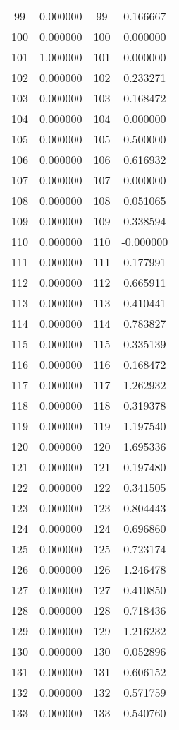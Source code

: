 \documentclass[12pt]{article}
\begin{document}
\begin{longtable}{@{}cccc@{}}
99 & 0.000000 & 99 & 0.166667 \\
100 & 0.000000 & 100 & 0.000000 \\
101 & 1.000000 & 101 & 0.000000 \\
102 & 0.000000 & 102 & 0.233271 \\
103 & 0.000000 & 103 & 0.168472 \\
104 & 0.000000 & 104 & 0.000000 \\
105 & 0.000000 & 105 & 0.500000 \\
106 & 0.000000 & 106 & 0.616932 \\
107 & 0.000000 & 107 & 0.000000 \\
108 & 0.000000 & 108 & 0.051065 \\
109 & 0.000000 & 109 & 0.338594 \\
110 & 0.000000 & 110 & -0.000000 \\
111 & 0.000000 & 111 & 0.177991 \\
112 & 0.000000 & 112 & 0.665911 \\
113 & 0.000000 & 113 & 0.410441 \\
114 & 0.000000 & 114 & 0.783827 \\
115 & 0.000000 & 115 & 0.335139 \\
116 & 0.000000 & 116 & 0.168472 \\
117 & 0.000000 & 117 & 1.262932 \\
118 & 0.000000 & 118 & 0.319378 \\
119 & 0.000000 & 119 & 1.197540 \\
120 & 0.000000 & 120 & 1.695336 \\
121 & 0.000000 & 121 & 0.197480 \\
122 & 0.000000 & 122 & 0.341505 \\
123 & 0.000000 & 123 & 0.804443 \\
124 & 0.000000 & 124 & 0.696860 \\
125 & 0.000000 & 125 & 0.723174 \\
126 & 0.000000 & 126 & 1.246478 \\
127 & 0.000000 & 127 & 0.410850 \\
128 & 0.000000 & 128 & 0.718436 \\
129 & 0.000000 & 129 & 1.216232 \\
130 & 0.000000 & 130 & 0.052896 \\
131 & 0.000000 & 131 & 0.606152 \\
132 & 0.000000 & 132 & 0.571759 \\
133 & 0.000000 & 133 & 0.540760 \\

\end{longtable}
\end{document}
